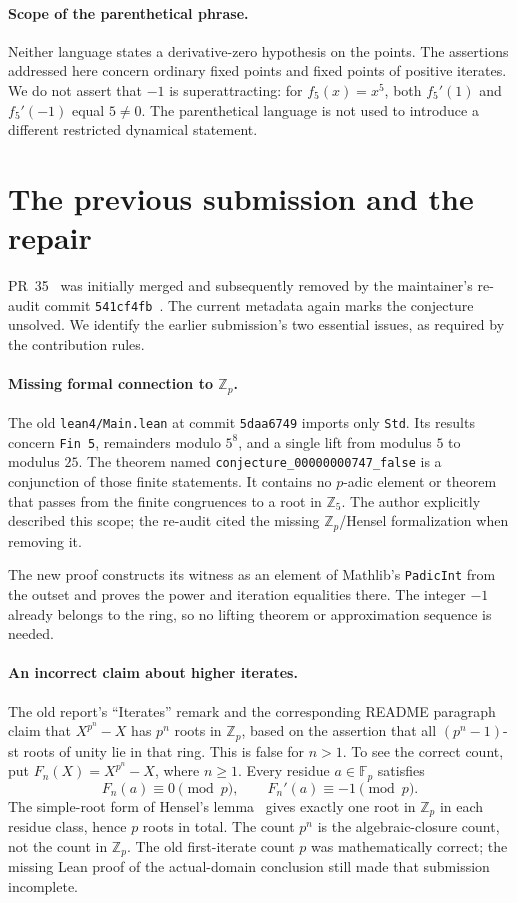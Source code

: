 \documentclass[11pt]{article}
\begin{document}
\paragraph{Scope of the parenthetical phrase.}
Neither language states a derivative-zero hypothesis on the points. The assertions addressed here concern ordinary fixed points and fixed points of positive iterates. We do not assert that $-1$ is superattracting: for $f_5(x)=x^5$, both $f_5'(1)$ and $f_5'(-1)$ equal $5\ne0$. The parenthetical language is not used to introduce a different restricted dynamical statement.

\section{The previous submission and the repair}
PR~35~\cite{oldpr} was initially merged and subsequently removed by the maintainer's re-audit commit \texttt{541cf4fb}~\cite{removal}. The current metadata again marks the conjecture unsolved. We identify the earlier submission's two essential issues, as required by the contribution rules.

\paragraph{Missing formal connection to $\mathbb Z_p$.}
The old \texttt{lean4/Main.lean} at commit \texttt{5daa6749} imports only \texttt{Std}. Its results concern \texttt{Fin 5}, remainders modulo $5^8$, and a single lift from modulus $5$ to modulus $25$. The theorem named \texttt{conjecture\_00000000747\_false} is a conjunction of those finite statements. It contains no $p$-adic element or theorem that passes from the finite congruences to a root in $\mathbb Z_5$. The author explicitly described this scope; the re-audit cited the missing $\mathbb Z_p$/Hensel formalization when removing it.

The new proof constructs its witness as an element of Mathlib's \texttt{PadicInt} from the outset and proves the power and iteration equalities there. The integer $-1$ already belongs to the ring, so no lifting theorem or approximation sequence is needed.

\paragraph{An incorrect claim about higher iterates.}
The old report's ``Iterates'' remark and the corresponding README paragraph claim that $X^{p^n}-X$ has $p^n$ roots in $\mathbb Z_p$, based on the assertion that all $(p^n-1)$-st roots of unity lie in that ring. This is false for $n>1$. To see the correct count, put $F_n(X)=X^{p^n}-X$, where $n\geq1$. Every residue $a\in\mathbb F_p$ satisfies
\[
 F_n(a)\equiv0\pmod p,\qquad F_n'(a)\equiv-1\pmod p.
\]
The simple-root form of Hensel's lemma~\cite[Theorem~2.1]{conrad} gives exactly one root in $\mathbb Z_p$ in each residue class, hence $p$ roots in total. The count $p^n$ is the algebraic-closure count, not the count in $\mathbb Z_p$. The old first-iterate count $p$ was mathematically correct; the missing Lean proof of the actual-domain conclusion still made that submission incomplete.
\end{document}
